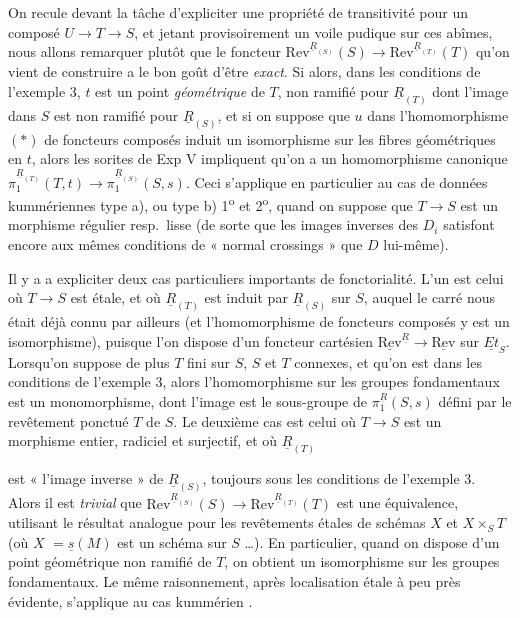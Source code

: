 \documentclass[11pt,a4paper]{article}
\begin{document}
On recule devant la tâche d'expliciter une propriété de transitivité pour un
composé $U \to T \to S$, et jetant provisoirement un voile pudique sur ces
abîmes, nous allons remarquer plutôt que le foncteur
$\mathrm{Rev}^{\underline{R}_{(S)}}(S) \to
\mathrm{Rev}^{\underline{R}_{(T)}}(T)$ qu'on vient de construire a le bon goût
d'être \emph{exact}. Si alors, dans les conditions de l'exemple 3, $t$ est un
point \emph{géométrique} de $T$, non ramifié pour $\underline{R}_{(T)}$ dont
l'image dans $S$ est non ramifié pour $\underline{R}_{(S)}$, et si on suppose
que $u$ dans l'homomorphisme $(*)$ de foncteurs composés induit un isomorphisme
sur les fibres géométriques en $t$, alors les sorites de Exp V impliquent qu'on
a un homomorphisme canonique $\pi_1^{\underline{R}_{(T)}}(T, t) \to
\pi_1^{\underline{R}_{(S)}}(S, s)$. Ceci s'applique en particulier au cas de
données kummériennes type a), ou type b) 1\textsuperscript{o} et
2\textsuperscript{o}, quand on suppose que $T \to S$ est un morphisme régulier
resp.\ lisse (de sorte que les images inverses des $D_i$ satisfont encore aux
mêmes conditions de « normal crossings » que $D$ lui-même).

Il y a a expliciter deux cas particuliers importants de fonctorialité. L'un est
celui où $T \to S$ est étale, et où $\underline{R}_{(T)}$ est induit par
$\underline{R}_{(S)}$ sur $S$, auquel le  carré nous était
déjà connu par ailleurs (et l'homomorphisme de foncteurs composés y est un
isomorphisme), puisque l'on dispose d'un foncteur cartésien
$\underline{\mathrm{Rev}}^{\underline{R}} \to \underline{\mathrm{Rev}}$ sur
$\underline{Et}_S$. Lorsqu'on suppose de plus $T$ fini sur $S$, $S$ et $T$
connexes, et qu'on est dans les conditions de l'exemple 3, alors
l'homomorphisme sur les groupes fondamentaux est un monomorphisme, dont l'image
est le sous-groupe de $\pi_1^{\underline{R}}(S, s)$ défini par le revêtement
ponctué $T$ de $S$. Le deuxième cas est celui où $T \to S$ est un morphisme
entier, radiciel et surjectif, et où $\underline{R}_{(T)}$

est « l'image inverse » de $\underline{R}_{(S)}$, toujours sous les conditions
de l'exemple 3. Alors il est \emph{trivial} que
$\mathrm{Rev}^{\underline{R}_{(S)}}(S) \to
\mathrm{Rev}^{\underline{R}_{(T)}}(T)$ est une équivalence, utilisant le
résultat analogue pour les revêtements étales de schémas $X$ et
$X \times_S T$ (où $X$  $= \underline{s}(M)$ est un schéma
\struck{\ill{}} sur $S$ …). En particulier, quand on dispose d'un point
géométrique non ramifié de $T$, on obtient un isomorphisme sur les groupes
fondamentaux. Le même raisonnement, après localisation étale à peu près
évidente, s'applique au cas kummérien \struck{\ill{}}.
\end{document}
